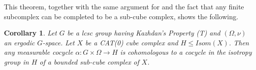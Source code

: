 \documentclass{amsart}
\numberwithin{equation}{section}
\newtheorem{cor}[thm]{Corollary}
\theoremstyle{definition}
\begin{document}
This theorem, together with the same argument for \cite[Theorem 1.1]{AdamsSpatzier} and the fact that any finite subcomplex can be completed to be a sub-cube complex, shows the following.

\begin{cor}\label{cor:cocycle_cube_propertyT}
   Let $G$ be a lcsc group having Kazhdan's Property (T) and $(\Omega,\nu)$ an ergodic $G$-space. Let $X$ be a CAT(0) cube complex and $H \leq Isom(X)$. Then any measurable cocycle $\alpha: G \times \Omega \to H$ is cohomologous to a cocycle in the isotropy group in $H$ of a bounded sub-cube complex of $X$.
\end{cor}
\end{document}
